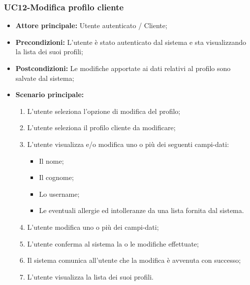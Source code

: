 \subsubsection{UC12-Modifica profilo cliente}
\begin{itemize}
\item \textbf{Attore principale:} Utente autenticato / Cliente;
\item \textbf{Precondizioni:} L'utente è stato autenticato dal sistema e sta visualizzando la lista dei suoi profili;
\item \textbf{Postcondizioni:} Le modifiche apportate ai dati relativi al profilo sono salvate dal sistema;
\item \textbf{Scenario principale:}
\begin{enumerate}
    \item L'utente seleziona l'opzione di modifica del profilo;
    \item L'utente seleziona il profilo cliente da modificare;
    \item L'utente visualizza e/o modifica uno o più dei seguenti campi-dati:
        \begin{itemize}
            \item Il nome;
            \item Il cognome;
            \item Lo username;
            \item Le eventuali allergie ed intolleranze da una lista fornita dal sistema.
        \end{itemize}
    \item L'utente modifica uno o più dei campi-dati;
    \item L'utente conferma al sistema la o le modifiche effettuate;
    \item Il sistema comunica all'utente che la modifica è avvenuta con successo;
    \item L'utente visualizza la lista dei suoi profili.
\end{enumerate}
\end{itemize}

